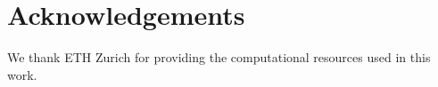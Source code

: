 \section*{Acknowledgements}

We thank ETH Zurich for providing the computational resources used in this work.
